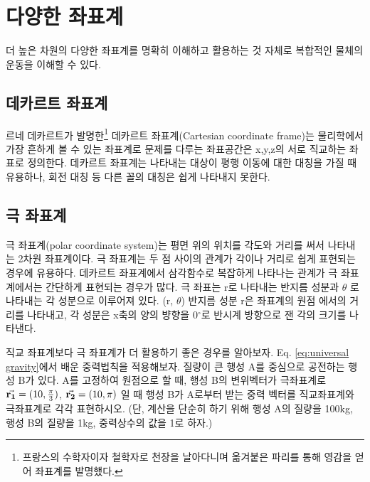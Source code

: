 
\section{다양한 좌표계}

\begin{flushleft}
더 높은 차원의 다양한 좌표계를 명확히 이해하고 활용하는 것 자체로 복합적인 물체의 운동을 이해할 수 있다.
  
\subsection{데카르트 좌표계}
르네 데카르트가 발명한\footnote{프랑스의 수학자이자 철학자로 천장을 날아다니며 옮겨붙은 파리를 통해 영감을 얻어 좌표계를 발명했다.}
데카르트 좌표계(Cartesian coordinate frame)는 물리학에서 가장 흔하게 볼 수 있는 좌표계로 
문제를 다루는 좌표공간은 x,y,z의 서로 직교하는 좌표로 정의한다. 
데카르트 좌표계는 나타내는 대상이 평행 이동에 대한 대칭을 가질 때 유용하나, 회전 대칭 등 다른 꼴의 대칭은 쉽게 나타내지 못한다.


\subsection{극 좌표계}
극 좌표계(polar coordinate system)는 평면 위의 위치를 각도와 거리를 써서 나타내는 2차원 좌표계이다. 극 좌표계는 두 점 사이의 관계가
각이나 거리로 쉽게 표현되는 경우에 유용하다. 데카르트 좌표계에서 삼각함수로 복잡하게 나타나는 관계가 극 좌표계에서는 간단하게 표현되는
경우가 많다. 극 좌표는 r로 나타내는 반지름 성분과 $\theta$ 로 나타내는 각 성분으로 이루어져 있다. (r, $\theta$) 반지름 성분 r은 좌표계의 원점
에서의 거리를 나타내고, 각 성분은 x축의 양의 뱡향을 0$^{\circ}$로 반시계 방향으로 잰 각의 크기를 나타낸다.  

  \begin{task}
직교 좌표계보다 극 좌표계가 더 활용하기 좋은 경우를 알아보자. Eq. \ref{eq:universal gravity}에서 
배운 중력법칙을 적용해보자. 질량이 큰 행성 A를 중심으로 공전하는 행성 B가 있다. A를 고정하여 원점으로 할 때, 
행성 B의 변위벡터가 극좌표계로 $\va{r_1}=(10, \frac{\pi}{3})$, $\va{r_2}=(10,{\pi})$ 일 때 행성 B가 
A로부터 받는 중력 벡터를 직교좌표계와 극좌표계로 각각 표현하시오. (단, 계산을 단순히 하기 위해 행성 A의 질량을 100kg, 행성 B의 질량을 1kg,
중력상수의 값을 1로 하자.)
\end{task}



\end{flushleft}
